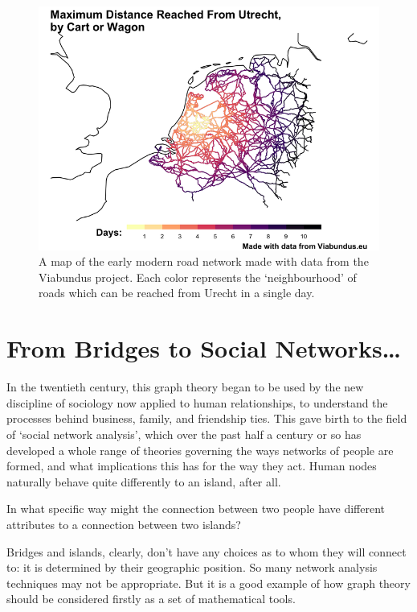 \documentclass[
]{book}
\begin{document}
\begin{figure}
\centering
\includegraphics[width=5.20833in,height=\textheight]{images/viabundus.png}
\caption{A map of the early modern road network made with data from the Viabundus project. Each color represents the `neighbourhood' of roads which can be reached from Urecht in a single day.}
\end{figure}

\hypertarget{from-bridges-to-social-networks}{%
\section{From Bridges to Social Networks\ldots{}}\label{from-bridges-to-social-networks}}

In the twentieth century, this graph theory began to be used by the new discipline of sociology now applied to human relationships, to understand the processes behind business, family, and friendship ties. This gave birth to the field of `social network analysis', which over the past half a century or so has developed a whole range of theories governing the ways networks of people are formed, and what implications this has for the way they act. Human nodes naturally behave quite differently to an island, after all.

In what specific way might the connection between two people have different attributes to a connection between two islands?

Bridges and islands, clearly, don't have any choices as to whom they will connect to: it is determined by their geographic position. So many network analysis techniques may not be appropriate. But it is a good example of how graph theory should be considered firstly as a set of mathematical tools.
\end{document}
